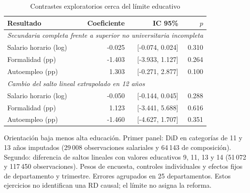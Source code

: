 \begin{table}[H]\centering
\caption{Contrastes exploratorios cerca del límite educativo}\label{tab:short_local}
\begin{threeparttable}\small
\setlength{\tabcolsep}{4pt}
\begin{tabular}{lrrr}
\toprule
Resultado & Coeficiente & IC 95\% & $p$ \\
\midrule
\multicolumn{4}{l}{\emph{Secundaria completa frente a superior no universitaria incompleta}} \\
Salario horario (log) & -0.025 & [-0.074, 0.024] & 0.310 \\
Formalidad (pp) & -1.403 & [-3.933, 1.127] & 0.264 \\
Autoempleo (pp) & 1.303 & [-0.271, 2.877] & 0.100 \\
\multicolumn{4}{l}{\emph{Cambio del salto lineal extrapolado en 12 años}} \\
Salario horario (log) & -0.050 & [-0.144, 0.045] & 0.288 \\
Formalidad (pp) & 1.123 & [-3.441, 5.688] & 0.616 \\
Autoempleo (pp) & -1.460 & [-4.627, 1.707] & 0.351 \\
\bottomrule
\end{tabular}
\begin{tablenotes}\footnotesize
\item Orientación baja menos alta educación. Primer panel: DiD en categorías de 11 y 13 años imputados (29\,008 observaciones salariales y 64\,143 de composición). Segundo: diferencia de saltos lineales con valores educativos 9, 11, 13 y 14 (51\,072 y 117\,450 observaciones). Pesos de encuesta, controles individuales y efectos fijos de departamento y trimestre. Errores agrupados en 25 departamentos. Estos ejercicios no identifican una RD causal; el límite no asigna la reforma.
\end{tablenotes}
\end{threeparttable}\end{table}
